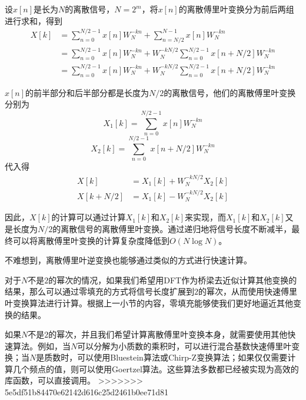 设$x[n]$是长为$N$的离散信号，$N=2^m$，将$x[n]$的离散傅里叶变换分为前后两组进行求和，得到
\begin{align*}
X[k]&=\sum_{n=0}^{N/2-1}x[n]W_N^{-kn}+\sum_{n=N/2}^{N-1}x[n]W_N^{-kn}\\
&=\sum_{n=0}^{N/2-1}x[n]W_N^{-kn}+W_N^{-kN/2}\sum_{n=0}^{N/2-1}x[n+N/2]W_N^{-kn}\\
&=\sum_{n=0}^{N/2-1}x[n]W_N^{-kn}+W_N^{-kN/2}\sum_{n=0}^{N/2-1}x[n+N/2]W_N^{-kn}
\end{align*}

$x[n]$的前半部分和后半部分都是长度为$N/2$的离散信号，他们的离散傅里叶变换分别为$$X_1[k]=\sum_{n=0}^{N/2-1}x[n]W_N^{-kn}$$
$$X_2[k]=\sum_{n=0}^{N/2-1}x[n+N/2]W_N^{-kn}$$
代入得
\begin{align*}
X[k]&=X_1[k]+W_N^{-kN/2}X_2[k]\\
X[k+N/2]&=X_1[k]-W_N^{-kN/2}X_2[k]
\end{align*}

因此，$X[k]$的计算可以通过计算$X_1[k]$和$X_2[k]$来实现，而$X_1[k]$和$X_2[k]$又是长度为$N/2$的离散信号的离散傅里叶变换。通过递归地将信号长度不断减半，最终可以将离散傅里叶变换的计算复杂度降低到$O(N\log N)$。

不难想到，离散傅里叶逆变换也能够通过类似的方式进行快速计算。

对于$N$不是$2$的幂次的情况，如果我们希望用DFT作为桥梁去近似计算其他变换的结果，那么可以通过零填充的方式将信号长度扩展到$2$的幂次，从而使用快速傅里叶变换算法进行计算。根据上一小节的内容，零填充能够使我们更好地逼近其他变换的结果。

如果$N$不是$2$的幂次，并且我们希望计算离散傅里叶变换本身，就需要使用其他快速算法。例如，当$N$可以分解为小质数的乘积时，可以进行混合基数快速傅里叶变换；当$N$是质数时，可以使用Bluestein算法或Chirp-Z变换算法；如果仅仅需要计算几个频点的值，则可以使用Goertzel算法。这些算法多数都已经被实现为高效的库函数，可以直接调用。
>>>>>>> 5e5df51b84470e62142d616c25d2461b0ee71d81
